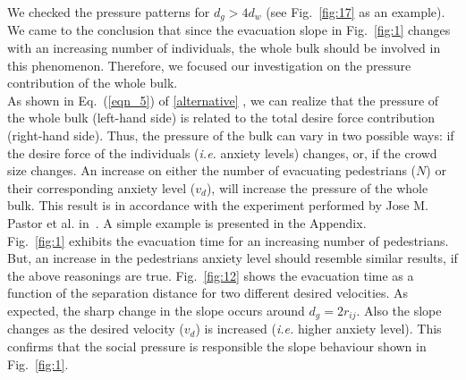 We checked the pressure patterns for $d_g>4d_w$ (see Fig.~\ref{fig:17} as an 
example). We came to the conclusion that since the evacuation slope in 
Fig.~\ref{fig:1} changes with an increasing number of individuals, the whole 
bulk should be involved in this phenomenon. Therefore, we focused our 
investigation on the pressure contribution of the whole bulk.  \\ 

As shown in Eq.~(\ref{eqn_5}) of \ref{alternative} , we can realize that the pressure of the 
whole bulk (left-hand side) is related to the total desire force contribution 
(right-hand side). Thus, the pressure of the bulk can vary in two possible 
ways: if the desire force of the individuals (\emph{i.e.} anxiety levels) 
changes, or, if the crowd size changes. An increase on either 
the number of evacuating pedestrians ($N$) or their corresponding anxiety 
level ($v_d$), will increase the pressure of the whole bulk. {\color{red} This result is in accordance with the experiment performed by Jose M. Pastor et al. in~\cite{Pastor}.}
A simple example is presented in the Appendix. \\

Fig.~\ref{fig:1} exhibits the evacuation time for an increasing number of 
pedestrians. But, an increase in the pedestrians anxiety level should  
resemble similar results, if the above reasonings are true. Fig.~\ref{fig:12} 
shows the evacuation time as a function of the separation distance for two 
different desired velocities. As expected, the sharp change in the slope occurs 
around $d_g=2r_{ij}$. Also the slope changes as the desired velocity ($v_d$) is 
increased (\emph{i.e.} higher anxiety level). This confirms that the social 
pressure is responsible the slope behaviour shown in Fig.~\ref{fig:1}. \\


